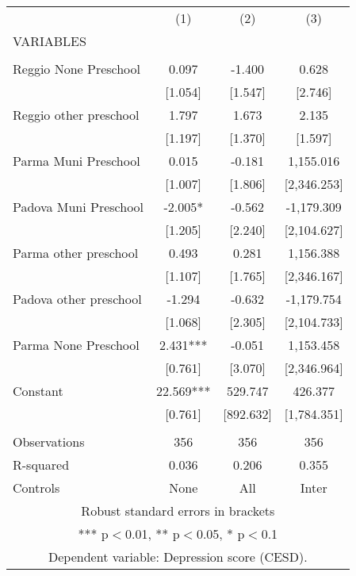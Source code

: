 \begin{tabular}{lccc} \hline
 & (1) & (2) & (3) \\
VARIABLES &  &  &  \\ \hline
 &  &  &  \\
Reggio None Preschool & 0.097 & -1.400 & 0.628 \\
 & [1.054] & [1.547] & [2.746] \\
Reggio other preschool & 1.797 & 1.673 & 2.135 \\
 & [1.197] & [1.370] & [1.597] \\
Parma Muni Preschool & 0.015 & -0.181 & 1,155.016 \\
 & [1.007] & [1.806] & [2,346.253] \\
Padova Muni Preschool & -2.005* & -0.562 & -1,179.309 \\
 & [1.205] & [2.240] & [2,104.627] \\
Parma other preschool & 0.493 & 0.281 & 1,156.388 \\
 & [1.107] & [1.765] & [2,346.167] \\
Padova other preschool & -1.294 & -0.632 & -1,179.754 \\
 & [1.068] & [2.305] & [2,104.733] \\
Parma None Preschool & 2.431*** & -0.051 & 1,153.458 \\
 & [0.761] & [3.070] & [2,346.964] \\
Constant & 22.569*** & 529.747 & 426.377 \\
 & [0.761] & [892.632] & [1,784.351] \\
 &  &  &  \\
Observations & 356 & 356 & 356 \\
R-squared & 0.036 & 0.206 & 0.355 \\
 Controls & None & All & Inter \\ \hline
\multicolumn{4}{c}{ Robust standard errors in brackets} \\
\multicolumn{4}{c}{ *** p$<$0.01, ** p$<$0.05, * p$<$0.1} \\
\multicolumn{4}{c}{ Dependent variable: Depression score (CESD).} \\
\end{tabular}
